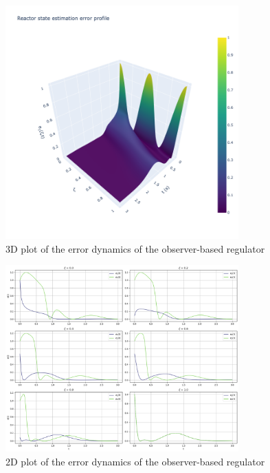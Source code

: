 \begin{figure}[H]
    \centering
    \includegraphics[width=0.8\textwidth]{Figures/3D_e1_L_k7.png}
    \caption{3D plot of the error dynamics of the observer-based regulator}
    \label{fig:3D_e1_L_k7}
\end{figure}

\begin{figure}[H]
    \centering
    \includegraphics[width=0.8\textwidth]{Figures/2D_et_L_k7.png}
    \caption{2D plot of the error dynamics of the observer-based regulator}
    \label{fig:2D_et_L_k7}
\end{figure}